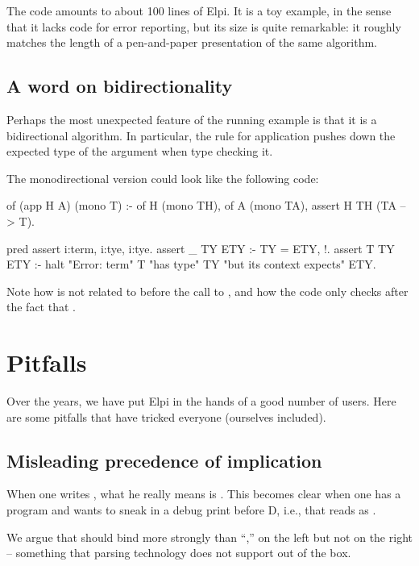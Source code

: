 \documentclass[a4paper, 11pt]{book}
\begin{document}
The code amounts to about 100 lines of Elpi. It is a toy example, in the sense
that it lacks code for error reporting, but its size is quite remarkable: it
roughly matches the length of a pen-and-paper presentation of the same
algorithm.

\subsection{A word on bidirectionality}

Perhaps the most unexpected feature of the running example is that it is a
bidirectional algorithm. In particular, the rule for application pushes down
the expected type of the argument when type checking it.

The monodirectional version could look like the following code:

\begin{elpicode}
of (app H A) (mono T) :-
  of H (mono TH),
  of A (mono TA),
  assert H TH (TA --> T).

pred assert i:term, i:tye, i:tye.
assert _ TY ETY :- TY = ETY, !.
assert T TY ETY :-
  halt "Error: term" T "has type" TY "but its context expects" ETY.
\end{elpicode}

\noindent
Note how  is not related to  before the call to
, and how the code only checks after the fact that
.

\section{Pitfalls}

Over the years, we have put Elpi in the hands of a good number of users. Here
are some pitfalls that have tricked everyone (ourselves included).

\subsection{Misleading precedence of implication}

When one writes , what he really means is .
This becomes clear when one has a program  and wants to sneak in
a debug print before D, i.e.,  that reads as
.

We argue that \elpi{=>} should bind more strongly than ``,'' on the left but
not on the right -- something that parsing technology does not support out of the
box. 
\end{document}
